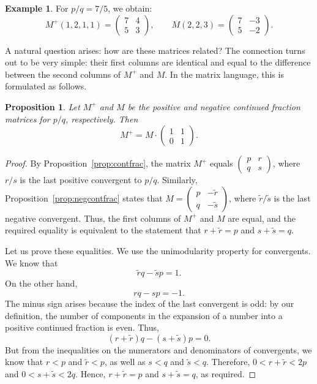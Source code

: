 \documentclass[a4paper,11pt]{amsart}
\theoremstyle{plain}
\newtheorem{prop}[theorem]{Proposition}
\theoremstyle{remark}
\theoremstyle{definition}
\newtheorem{example}[theorem]{Example}
\numberwithin{equation}{section}
\numberwithin{figure}{section}
\begin{document}
\begin{example}
For $p/q = 7/5$, we obtain:
\[
M^+(1, 2, 1, 1) = \begin{pmatrix}7 & 4\\5 & 3\end{pmatrix},
\qquad
M(2, 2, 3) = \begin{pmatrix}7 & -3\\5 & -2\end{pmatrix}.
\]
\end{example}

A natural question arises: how are these matrices related? The connection turns out to be very simple: their first columns are identical and equal to the difference between the second columns of $M^+$ and $M$. In the matrix language, this is formulated as follows.

\begin{prop}\label{pr:mplusmr} Let $M^+$ and $M$ be the positive and negative continued fraction matrices for $p/q$, respectively. Then
\[
M^+ = M \cdot \begin{pmatrix}1 & 1\\0 & 1\end{pmatrix}.
\]
\end{prop}

\begin{proof}
By Proposition~\ref{prop:contfrac}, the matrix $M^+$ equals $\begin{pmatrix}p & r\\q & s\end{pmatrix}$, where $r/s$ is the last positive convergent to $p/q$. Similarly, Proposition~\ref{prop:negcontfrac} states that $M = \begin{pmatrix}p & -\tilde{r}\\q & -\tilde{s}\end{pmatrix}$, where $\tilde{r}/\tilde{s}$ is the last negative convergent. Thus, the first columns of $M^+$ and $M$ are equal, and the required equality is equivalent to the statement that $r + \tilde{r} = p$ and $s + \tilde{s} = q$.

Let us prove these equalities. We use the unimodularity property for convergents. We know that
\[
\tilde{r} q - \tilde{s} p = 1.
\]
On the other hand,
\[
r q - s p = -1.
\]
The minus sign arises because the index of the last convergent is odd: by our definition, the number of components in the expansion of a number into a positive continued fraction is even. Thus,
\[
(r + \tilde{r}) q - (s + \tilde{s}) p = 0.
\]
But from the inequalities on the numerators and denominators of convergents, we know that $r < p$ and $\tilde{r} < p$, as well as $s < q$ and $\tilde{s} < q$. Therefore, $0 < r + \tilde{r} < 2p$ and $0 < s + \tilde{s} < 2q$. Hence, $r + \tilde{r} = p$ and $s + \tilde{s} = q$, as required.
\end{proof}
\end{document}
